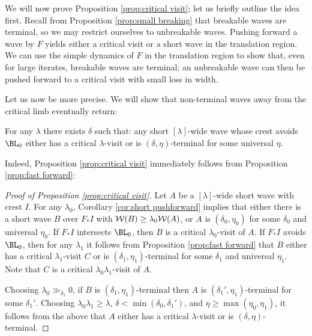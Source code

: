 \documentclass[12pt]{amsart}
\begin{document}
We will now prove Proposition \ref{prop:critical visit}; let us briefly outline the idea first.
Recall from Proposition \ref{prop:small breaking} that breakable waves are terminal, so we may restrict ourselves  to unbreakable waves. 
Pushing forward a wave by $F$ yields either a critical visit or a short wave in the translation region.
We can use the simple dynamics of $F$ in the translation region to show that, even for large iterates,  breakable waves are terminal; an unbreakable wave can then be pushed forward to a critical visit with small loss in width. 



Let us now be more precise. We will show that non-terminal waves away from the critical limb eventually return:
\begin{prop}\label{prop:fast forward}
	For any $\lambda$ there exists $\delta$ such that: any short $[\lambda]$-wide wave whose crest avoids $\BL_0$ either has a critical $\lambda$-visit or is $(\delta, \eta)$-terminal for some universal $\eta$.
\end{prop}

Indeed, Proposition \ref{prop:critical visit} immediately follows from Proposition \ref{prop:fast forward}:

\begin{proof}[Proof of Proposition \ref{prop:critical visit}]
	Let $A$ be a $[\lambda]$-wide short wave with crest $I$. For any $\lambda_0$, Corollary \ref{cor:short pushforward} implies that either there is a short wave $B$ over $F_*I$ with $\mathcal W(B)\geq \lambda_0\mathcal W(A)$, or $A$ is $(\delta_0, \eta_0)$ for some $\delta_0$ and universal $\eta_0$. If $F_*I$ intersects $\BL_0$, then $B$ is a critical $\lambda_0$-visit of $A$. 
	If $F_*I$ avoids $\BL_0$, then for any $\lambda_1$ it follows from Proposition \ref{prop:fast forward} that  $B$ either has a critical $\lambda_1$-visit $C$ or is $(\delta_1, \eta_1)$-terminal for some $\delta_1$ and universal $\eta_1$. Note that $C$ is a critical $\lambda_0\lambda_1$-visit of $A$.
	
	Choosing $\lambda_0\gg_{\delta_1} 0$,  if $B$ is $(\delta_1, \eta_1)$-terminal then $A$ is $(\delta_1', \eta_1)$-terminal for some $\delta_1'$. 
	Choosing $\lambda_0\lambda_1\geq \lambda$,  $\delta< \min(\delta_0, \delta_1')$, and $\eta\geq \max(\eta_0, \eta_1)$, it follows from the above that $A$ either has a critical $\lambda$-visit or is $(\delta, \eta)$-terminal.
\end{proof}
\end{document}
